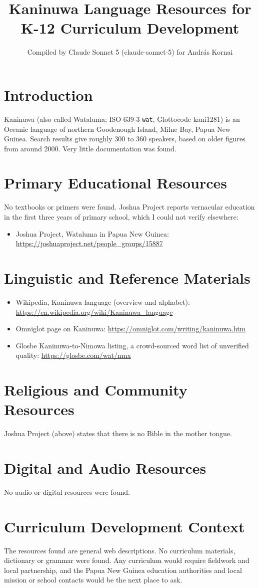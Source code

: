 \documentclass[12pt]{article}
\title{Kaninuwa Language Resources for K-12 Curriculum Development}
\author{Compiled by Claude Sonnet 5 (claude-sonnet-5) for Andr\'as Kornai}
\date{}
\begin{document}
\maketitle

\section{Introduction}
Kaninuwa (also called Wataluma; ISO 639-3 \texttt{wat}, Glottocode kani1281) is an Oceanic language of northern Goodenough Island, Milne Bay, Papua New Guinea. Search results give roughly 300 to 360 speakers, based on older figures from around 2000. Very little documentation was found.

\section{Primary Educational Resources}
No textbooks or primers were found. Joshua Project reports vernacular education in the first three years of primary school, which I could not verify elsewhere:
\begin{itemize}
\item Joshua Project, Wataluma in Papua New Guinea: \url{https://joshuaproject.net/people_groups/15887}
\end{itemize}

\section{Linguistic and Reference Materials}
\begin{itemize}
\item Wikipedia, Kaninuwa language (overview and alphabet): \url{https://en.wikipedia.org/wiki/Kaninuwa_language}
\item Omniglot page on Kaninuwa: \url{https://omniglot.com/writing/kaninuwa.htm}
\item Glosbe Kaninuwa-to-Nimowa listing, a crowd-sourced word list of unverified quality: \url{https://glosbe.com/wat/nmx}
\end{itemize}

\section{Religious and Community Resources}
Joshua Project (above) states that there is no Bible in the mother tongue.

\section{Digital and Audio Resources}
No audio or digital resources were found.

\section{Curriculum Development Context}
The resources found are general web descriptions. No curriculum materials, dictionary or grammar were found. Any curriculum would require fieldwork and local partnership, and the Papua New Guinea education authorities and local mission or school contacts would be the next place to ask.
\end{document}
